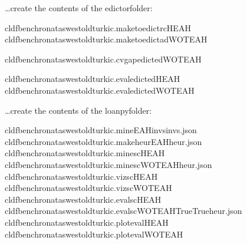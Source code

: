\documentclass[letterpaper,10pt,english]{sphinxmanual}
\begin{document}
\sphinxAtStartPar
…create the contents of the edictor\sphinxhyphen{}folder:

\begin{sphinxVerbatim}[commandchars=\\\{\}]
cldfbenchronataswestoldturkic.maketoedict\PYGZus{}rcHEAH
cldfbenchronataswestoldturkic.maketoedict\PYGZus{}adWOTEAH

cldfbenchronataswestoldturkic.cvgapedictedWOTEAH

cldfbenchronataswestoldturkic.evaledictedHEAH
cldfbenchronataswestoldturkic.evaledictedWOTEAH
\end{sphinxVerbatim}

\sphinxAtStartPar
…create the contents of the loanpy\sphinxhyphen{}folder:

\begin{sphinxVerbatim}[commandchars=\\\{\}]
cldfbenchronataswestoldturkic.mineEAHinvsinvs.json
cldfbenchronataswestoldturkic.makeheurEAHheur.json
cldfbenchronataswestoldturkic.minescHEAH
cldfbenchronataswestoldturkic.minescWOTEAHheur.json
cldfbenchronataswestoldturkic.vizscHEAH
cldfbenchronataswestoldturkic.vizscWOTEAH
cldfbenchronataswestoldturkic.evalscHEAH
cldfbenchronataswestoldturkic.evalscWOTEAHTrueTrueheur.json
cldfbenchronataswestoldturkic.plot\PYGZus{}evalHEAH
cldfbenchronataswestoldturkic.plot\PYGZus{}evalWOTEAH
\end{sphinxVerbatim}

\sphinxstepscope
\end{document}
